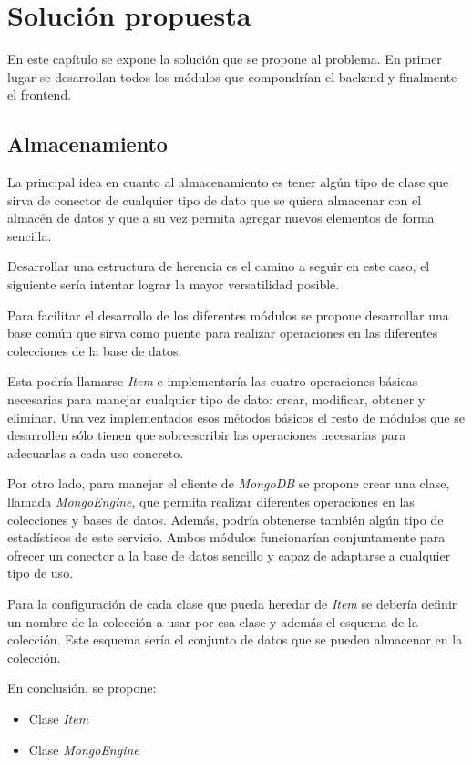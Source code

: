 \chapter{Solución propuesta}

En este capítulo se expone la solución que se propone al problema. En primer lugar se desarrollan todos los módulos que compondrían el backend y finalmente el frontend.




\section{Almacenamiento}

La principal idea en cuanto al almacenamiento es tener algún tipo de clase que sirva de conector de cualquier tipo de dato que se quiera almacenar con el almacén de datos y que a su vez permita agregar nuevos elementos de forma sencilla.

Desarrollar una estructura de herencia es el camino a seguir en este caso, el siguiente sería intentar lograr la mayor versatilidad posible.

Para facilitar el desarrollo de los diferentes módulos se propone desarrollar una base común que sirva como puente para realizar operaciones en las diferentes colecciones de la base de datos.

Esta podría llamarse \textit{Item} e implementaría las cuatro operaciones básicas necesarias para manejar cualquier tipo de dato: crear, modificar, obtener y eliminar. Una vez implementados esos métodos básicos el resto de módulos que se desarrollen sólo tienen que sobreescribir las operaciones necesarias para adecuarlas a cada uso concreto.

Por otro lado, para manejar el cliente de \textit{MongoDB} se propone crear una clase, llamada \textit{MongoEngine}, que permita realizar diferentes operaciones en las colecciones y bases de datos. Además, podría obtenerse también algún tipo de estadísticos de este servicio. Ambos módulos funcionarían conjuntamente para ofrecer un conector a la base de datos sencillo y capaz de adaptarse a cualquier tipo de uso.

Para la configuración de cada clase que pueda heredar de \textit{Item} se debería definir un nombre de la colección a usar por esa clase y además el esquema de la colección. Este esquema sería el conjunto de datos que se pueden almacenar en la colección.


\bigskip
En conclusión, se propone:
\begin{itemize}
	\item Clase \textit{Item}
	\item Clase \textit{MongoEngine}
\end{itemize}


